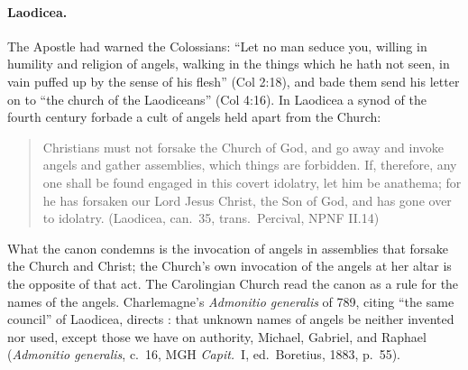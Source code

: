 \paragraph{Laodicea.} The Apostle had warned the Colossians: ``Let no man
seduce you, willing in humility and religion of angels, walking in the
things which he hath not seen, in vain puffed up by the sense of his
flesh'' (Col 2:18), and bade them send his letter on to ``the church of
the Laodiceans'' (Col 4:16). In Laodicea a synod of the fourth century
forbade a cult of angels held apart from the Church:
\begin{quote}
Christians must not forsake the Church of God, and go away and invoke
angels and gather assemblies, which things are forbidden. If, therefore,
any one shall be found engaged in this covert idolatry, let him be
anathema; for he has forsaken our Lord Jesus Christ, the Son of God, and
has gone over to idolatry. (Laodicea, can.~35, trans.\ Percival, NPNF
II.14)
\end{quote}
What the canon condemns is the invocation of angels in assemblies that
forsake the Church and Christ; the Church's own invocation of the angels
at her altar is the opposite of that act. The Carolingian Church read the
canon as a rule for the names of the angels. Charlemagne's
\emph{Admonitio generalis} of 789, citing ``the same council'' of
Laodicea, directs : that unknown names of angels be neither invented nor
used, except those we have on authority, Michael, Gabriel, and Raphael
(\emph{Admonitio generalis}, c.~16, MGH \emph{Capit.}\ I, ed.\ Boretius, 1883, p.~55).

